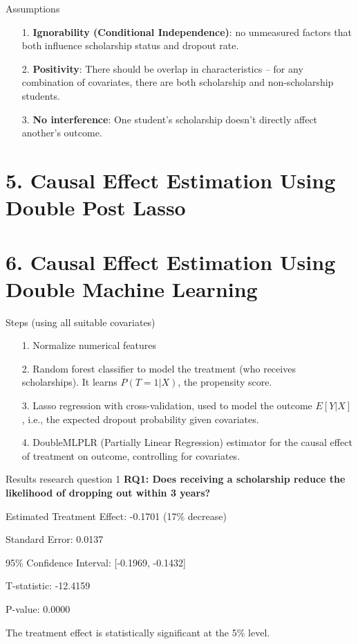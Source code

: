 \documentclass[aspectratio=169]{beamer}
\begin{document}
\begin{frame}{Assumptions}
\begin{itemize}
    \item [1.] \textbf{Ignorability (Conditional Independence)}: no unmeasured factors that both influence scholarship status and dropout rate.
    \item [2.] \textbf{Positivity}: There should be overlap in characteristics – for any combination of covariates, there are both scholarship and non-scholarship students.
    \item [3.] \textbf{No interference}: One student’s scholarship doesn’t directly affect another’s outcome.
\end{itemize}

\end{frame}



\section{5. Causal Effect Estimation Using Double Post Lasso}

\section{6. Causal Effect Estimation Using Double Machine Learning}

\begin{frame}{Steps (using all suitable covariates)}
\begin{itemize}
    \item [1.] Normalize numerical features
    \item[2.] Random forest classifier to model the treatment (who receives scholarships). It learns $P(T=1|X)$, the propensity score.
    \item [3.] Lasso regression with cross-validation, used to model the outcome $E[Y|X]$, i.e., the expected dropout probability given covariates.
    \item [4.] DoubleMLPLR (Partially Linear Regression) estimator for the causal effect of treatment on outcome, controlling for covariates.

\end{itemize}
    
\end{frame}

\begin{frame}{Results research question 1}
\textbf{RQ1: Does receiving a scholarship reduce the likelihood of dropping out within 3 years?}

Estimated Treatment Effect: -0.1701 (17\% decrease)

Standard Error: 0.0137

95\% Confidence Interval: [-0.1969, -0.1432]

T-statistic: -12.4159

P-value: 0.0000

The treatment effect is statistically significant at the 5\% level.


\end{frame}
\end{document}
